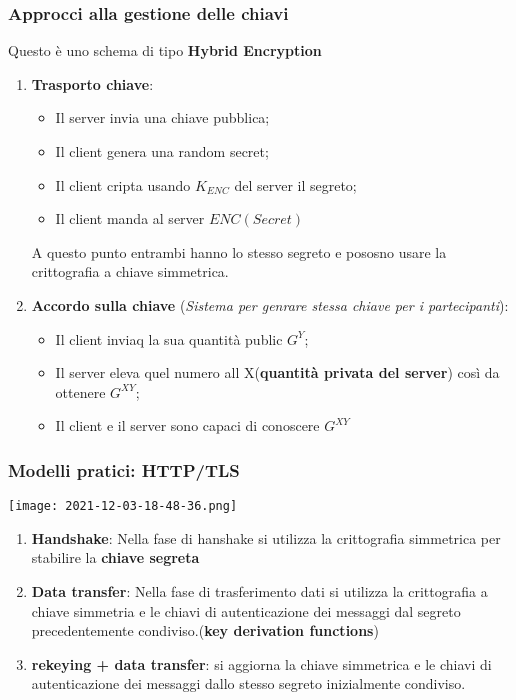 \documentclass{article}
\theoremstyle{remark}
\begin{document}
\subsubsection{Approcci alla gestione delle chiavi}
Questo è uno schema di tipo \textbf{Hybrid Encryption}
\begin{enumerate}
	\item \textbf{Trasporto chiave}:\begin{itemize}
		      \item Il server invia una chiave pubblica;
		      \item Il client genera una random secret;
		      \item Il client cripta usando \(K_{ENC}\) del server il segreto;
		      \item Il client manda al server \(ENC(Secret)\)
	      \end{itemize}
	      A questo punto entrambi hanno lo stesso segreto e pososno usare la crittografia a chiave simmetrica.
	\item \textbf{Accordo sulla chiave} (\emph{Sistema per genrare stessa chiave per i partecipanti}):\begin{itemize}
		      \item Il client inviaq la sua quantità public \(G^Y\);
		      \item Il server eleva quel numero all X(\textbf{quantità privata del server}) così da ottenere \(G^{XY}\);
		      \item Il client e il server sono capaci di conoscere \(G^{XY}\)
	      \end{itemize}
\end{enumerate}
\subsubsection{Modelli pratici: HTTP/TLS}
\begin{center}
	\texttt{[image: 2021-12-03-18-48-36.png]}
\end{center}
\begin{enumerate}
	\item \textbf{Handshake}: Nella fase di hanshake si utilizza la crittografia simmetrica per stabilire la \textbf{chiave segreta}
	\item \textbf{Data transfer}: Nella fase di trasferimento dati si utilizza la crittografia a chiave simmetria e le chiavi di autenticazione dei messaggi dal segreto precedentemente condiviso.(\textbf{key derivation functions})
	\item \textbf{rekeying + data transfer}: si aggiorna la chiave simmetrica e le chiavi di autenticazione dei messaggi dallo stesso segreto inizialmente condiviso.
\end{enumerate}
\end{document}
